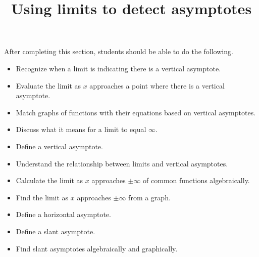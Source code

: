 \documentclass{ximera}
\title{Using limits to detect asymptotes}
\begin{document}
\begin{abstract}
\end{abstract}

\maketitle

\begin{sectionOutcomes}

After completing this section, students should be able to do the following.

\begin{itemize}
	\item Recognize when a limit is indicating there is a vertical asymptote.
	\item Evaluate the limit as $x$ approaches a point where there is a vertical asymptote.
	\item Match graphs of functions with their equations based on vertical asymptotes.
	\item Discuss what it means for a limit to equal $\infty$.
	\item Define a vertical asymptote.
	\item Understand the relationship between limits and vertical asymptotes.
	\item Calculate the limit as $x$ approaches $\pm \infty$ of common functions algebraically.
	\item Find the limit as $x$ approaches $\pm \infty$ from a graph.
	\item Define a horizontal asymptote.
	\item Define a slant asymptote.
	\item Find slant asymptotes algebraically and graphically.
\end{itemize}
\end{sectionOutcomes}
\end{document}
